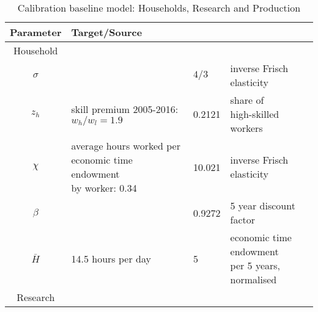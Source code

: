 	\begin{table}[hh!!!!!]
		\begin{center}
			\captionsetup{width=0.9\textwidth}
			\caption{ Calibration baseline model: Households, Research and Production}
			\label{tab:calib}
			\begin{tabular}{c|lll}
				\hline \hline
				Parameter& Target/Source& \makecell[l]{Calibration}& \makecell[l]{Meaning}\\ 
				\hline
				\hline
				Household&\multicolumn{3}{c}{}\\
				\hline 
				
				\hline
				$\sigma$ &  \makecell[l]{\cite{Chetty2011AreMargins}}& $4/3$ & inverse Frisch elasticity  \\
				\hline
				$z_h$& \makecell[l]{skill premium 2005-2016:\\ $w_h/w_l=1.9$\\ \citep{Slavik2020WagePremium}}&0.2121&\makecell[l]{share of\\ high-skilled workers} \\	
				\hline			
				$\chi$ &  \makecell[l]{average hours worked per\\ economic time endowment\\ by worker: 0.34 \cite{OECDHoursworked}}& 10.021 & inverse Frisch elasticity  \\
				\hline
				$\beta$ &  \makecell[l]{\cite{Barrage2019OptimalPolicy}}& 0.9272 & 5 year discount factor  \\
				\hline
				$\bar{H}$& \makecell[l]{14.5 hours per day\\ \cite{Jones1993OptimalGrowth}}&5&\makecell[l]{economic time endowment \\per 5 years, normalised} \\
				\hline
				\hline
				Research&\multicolumn{3}{c}{}\\
				\hline
				

\end{tabular}
\end{center}
\end{table}
